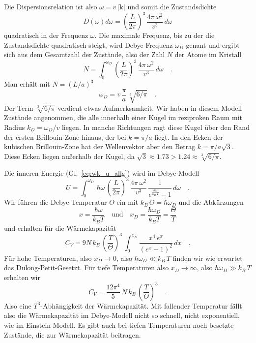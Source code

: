 Die Dispersionsrelation ist also $\omega = v \, | \mathbf{k} |$ und somit die Zustandsdichte
\begin{equation}
D(\omega) d\omega = \left( \frac{L}{2 \pi} \right)^3 \,     \frac{ 4 \pi \, \omega^2 }{v^3}   \, d\omega 
\end{equation} 
quadratisch in der Frequenz $\omega$. Die maximale Frequenz, bis zu der die Zustandsdichte quadratisch steigt, wird Debye-Frequenz $\omega_D$ genant und ergibt sich aus dem Gesamtzahl der Zustände, also der Zahl $N$ der Atome im Kristall
\begin{equation}
N = \int_0^{\omega_{D}}  \left( \frac{L}{2 \pi} \right)^3 \,     \frac{ 4 \pi \, \omega^2 }{v^3}   \, d\omega  \quad .
\end{equation}
Man erhält mit $N = (L / a)^3$
\begin{equation}
\omega_{D} = v \, \frac{\pi}{a} \, \sqrt[3]{6 / \pi} \quad .
\end{equation}
Der Term $\sqrt[3]{6 / \pi}$ verdient etwas Aufmerksamkeit. Wir haben in diesem Modell Zustände angenommen, die alle innerhalb einer Kugel im reziproken Raum mit Radius $k_{D} = \omega_{D} / v$ liegen. In manche Richtungen ragt diese Kugel über den Rand der ersten Brillouin-Zone hinaus, der bei $k = \pi / a$ liegt. In den  Ecken der kubischen Brillouin-Zone hat der Wellenvektor  aber den Betrag $k = \pi / a \sqrt{3}$. Diese Ecken liegen außerhalb der Kugel, da $\sqrt{3} \approx 1.73 > 1.24 \approx \sqrt[3]{6 / \pi}$.


Die inneren Energie  (Gl.~\ref{eq:wk_u_allg}) wird im Debye-Modell
\begin{equation}
U = \int_0^{\omega_D} \, \hbar \omega \,  \left( \frac{L}{2 \pi} \right)^3 \,     \frac{ 4 \pi \, \omega^2 }{v^3}  \,
\frac{1}{e^{\frac{\hbar \omega}{k_B \, T} }- 1} \, d\omega \quad .
\end{equation}
Wir führen die Debye-Temperatur $\Theta$ ein mit $k_B \, \Theta = \hbar \omega_D$ und die Abkürzungen
\begin{equation}
x = \frac{\hbar \omega}{k_B T} \quad \text{und} \quad
x_D = \frac{\hbar \omega_D}{k_B T}  = \frac{\Theta}{T}
\end{equation}
und erhalten für die Wärmekapazität
\begin{equation}
C_V = 9 N \, k_B \, \left(\frac{T}{\Theta} \right)^3 \,
\int_0^{x_D} \frac{x^4 \, e^x}{\left(  e^x - 1 \right)^2} \, dx \quad .
\end{equation}
Für hohe Temperaturen, also $x_D \rightarrow 0$, also $\hbar  \omega_D \ll k_B \, T$ finden wir wie erwartet das Dulong-Petit-Gesetzt. Für tiefe Temperaturen also $x_D \rightarrow \infty$, also $\hbar  \omega_D \gg k_B \, T$  erhalten wir
\begin{equation}
C_V = \frac{12 \pi^4}{5} \, N \, k_B \, \left(\frac{T}{\Theta} \right)^3 \quad .
\end{equation}
Also eine $T^3$-Abhängigkeit der Wärmekapazität. Mit fallender Temperatur fällt also die Wärmekapazität im Debye-Modell nicht so schnell, nicht exponentiell, wie im Einstein-Modell. Es gibt auch bei tiefen Temperaturen noch besetzte Zustände, die zur Wärmekapazität beitragen.

